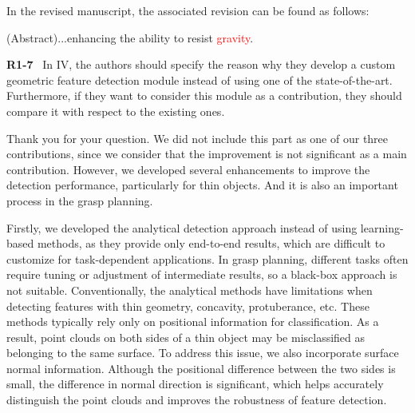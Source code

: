 \documentclass[journal]{IEEEtran}
\newcommand{\rev}[1]{\textcolor{red}{#1}}
\begin{document}
In the revised manuscript, the associated revision can be found as follows:

(Abstract)...enhancing the ability to resist \rev{gravity}.\\

\bigskip

\noindent
{\textbf{\color{black}R1-7}\color{gray}~
In IV, the authors should specify the reason why they develop a custom geometric feature detection module instead of using one of the state-of-the-art. Furthermore, if they want to consider this module as a contribution, they should compare it with respect to the existing ones.
}


Thank you for your question. 
We did not include this part as one of our three contributions, since we consider that the improvement is not significant as a main contribution. However, we developed several enhancements to improve the detection performance, particularly for thin objects. And it is also an important process in the grasp planning.

Firstly, we developed the analytical detection approach instead of using learning-based methods, as they provide only end-to-end results, which are difficult to customize for task-dependent applications. In grasp planning, different tasks often require tuning or adjustment of intermediate results, so a black-box approach is not suitable. Conventionally, the analytical methods have limitations when detecting features with thin geometry, concavity, protuberance, etc. These methods typically rely only on positional information for classification. As a result, point clouds on both sides of a thin object may be misclassified as belonging to the same surface. To address this issue, we also incorporate surface normal information. Although the positional difference between the two sides is small, the difference in normal direction is significant, which helps accurately distinguish the point clouds and improves the robustness of feature detection.
\end{document}
